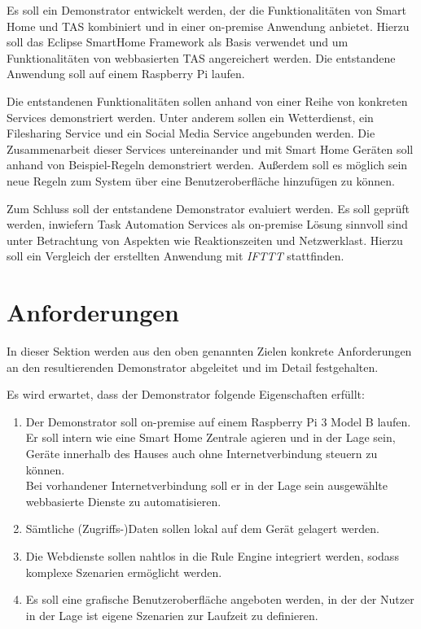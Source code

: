 Es soll ein Demonstrator entwickelt werden, der die Funktionalitäten von Smart Home und TAS kombiniert und in einer on-premise Anwendung anbietet. Hierzu soll das Eclipse SmartHome Framework als Basis verwendet und um Funktionalitäten von webbasierten TAS angereichert werden. Die entstandene Anwendung soll auf einem Raspberry Pi laufen.

Die entstandenen Funktionalitäten sollen anhand von einer Reihe von konkreten Services demonstriert werden. Unter anderem sollen ein Wetterdienst, ein Filesharing Service und ein Social Media Service angebunden werden. Die Zusammenarbeit dieser Services untereinander und mit Smart Home Geräten soll anhand von Beispiel-Regeln demonstriert werden. Außerdem soll es möglich sein neue Regeln zum System über eine Benutzeroberfläche hinzufügen zu können.

Zum Schluss soll der entstandene Demonstrator evaluiert werden. Es soll geprüft werden, inwiefern Task Automation Services als on-premise Lösung sinnvoll sind unter Betrachtung von Aspekten wie Reaktionszeiten und Netzwerklast. Hierzu soll ein Vergleich der erstellten Anwendung mit \textit{IFTTT} stattfinden.

\section{Anforderungen}
\label{sec:anforderungen}
In dieser Sektion werden aus den oben genannten Zielen konkrete Anforderungen an den resultierenden Demonstrator abgeleitet und im Detail festgehalten.

Es wird erwartet, dass der Demonstrator folgende Eigenschaften erfüllt:
\begin{enumerate}
\item Der Demonstrator soll on-premise auf einem Raspberry Pi 3 Model B laufen. Er soll intern wie eine Smart Home Zentrale agieren und in der Lage sein, Geräte innerhalb des Hauses auch ohne Internetverbindung steuern zu können. \\
Bei vorhandener Internetverbindung soll er in der Lage sein ausgewählte  webbasierte Dienste zu automatisieren.
\item Sämtliche (Zugriffs-)Daten sollen lokal auf dem Gerät gelagert werden. 
\item Die Webdienste sollen nahtlos in die Rule Engine integriert werden, sodass komplexe Szenarien ermöglicht werden.
\item Es soll eine grafische Benutzeroberfläche angeboten werden, in der der Nutzer in der Lage ist eigene Szenarien zur Laufzeit zu definieren.

\end{enumerate}


